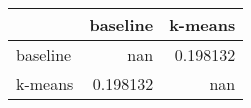 \begin{tabular}{lrr}
\toprule
          &   baseline &    k-means \\
\midrule
 baseline & nan        &   0.198132 \\
 k-means  &   0.198132 & nan        \\
\bottomrule
\end{tabular}